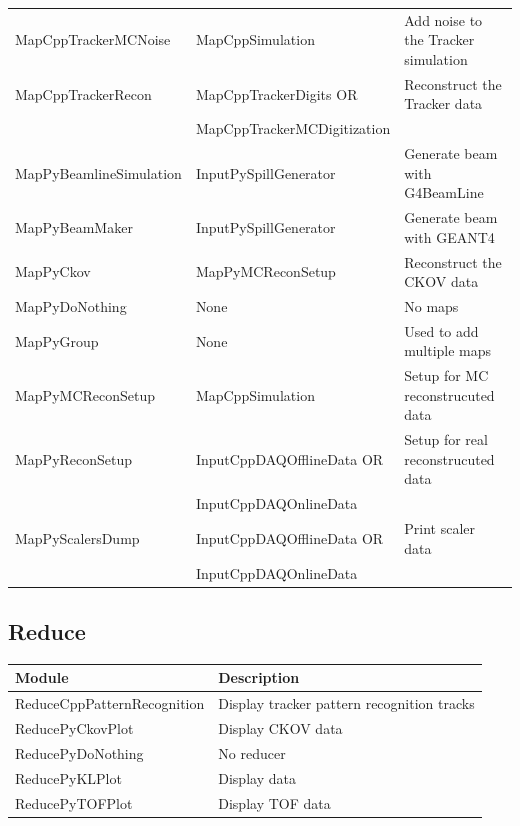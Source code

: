 \documentclass[a4paper,10pt]{article}
\begin{document}
\begin{small}
\begin{tabular}{| l | l | l |}
        MapCppTrackerMCNoise & MapCppSimulation & Add noise to the Tracker simulation \\
        MapCppTrackerRecon & MapCppTrackerDigits OR & Reconstruct the Tracker data \\
         & MapCppTrackerMCDigitization & \\
        MapPyBeamlineSimulation & InputPySpillGenerator & Generate beam with G4BeamLine \\
        MapPyBeamMaker & InputPySpillGenerator & Generate beam with GEANT4 \\
        MapPyCkov & MapPyMCReconSetup & Reconstruct the CKOV data \\
        MapPyDoNothing & None & No maps \\
        MapPyGroup & None & Used to add multiple maps \\
        MapPyMCReconSetup & MapCppSimulation & Setup for MC reconstrucuted data \\
        MapPyReconSetup & InputCppDAQOfflineData OR & Setup for real reconstrucuted data \\
         & InputCppDAQOnlineData & \\
        MapPyScalersDump & InputCppDAQOfflineData OR & Print scaler data \\
         & InputCppDAQOnlineData & \\
        \hline
      \end{tabular}
      \renewcommand{\arraystretch}{1.0}
    \end{small}
    \restoregeometry

\pagebreak

  \subsection{Reduce}
    \begin{small}
    \noindent
      \renewcommand{\arraystretch}{1.5}
      \begin{tabular}{| l | l |}
        \hline
        \textbf{Module} & \textbf{Description} \\
        \hline
        ReduceCppPatternRecognition & Display tracker pattern recognition tracks \\
        ReducePyCkovPlot & Display CKOV data \\
        ReducePyDoNothing & No reducer \\
        ReducePyKLPlot & Display data \\
        ReducePyTOFPlot & Display TOF data \\
        \hline
      \end{tabular}
      \renewcommand{\arraystretch}{1.0}
    \end{small}
\end{document}
